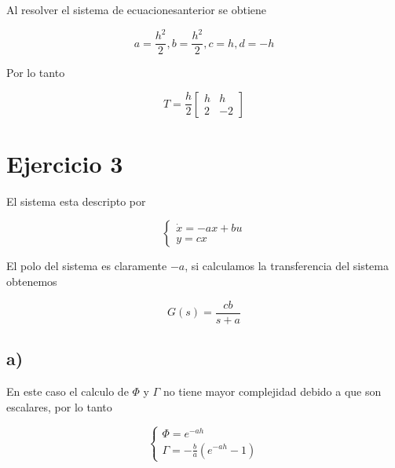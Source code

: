 \documentclass{article}
\begin{document}
        Al resolver el sistema de ecuacionesanterior se obtiene 

        \begin{equation}
            a = \frac{h^2}{2}, b = \frac{h^2}{2}, c=h, d=-h
        \end{equation}

        Por lo tanto 

        \begin{equation}
            T = \frac{h}{2}
                \begin{bmatrix}
                    h & h \\
                    2 & -2 
                \end{bmatrix}
        \end{equation}

    \section{Ejercicio 3}

    El sistema esta descripto por 

    \begin{equation}
        \left\{
            \begin{array}{c}
                \dot{x} = -ax + bu \\
                y = cx
            \end{array}    
        \right.
    \end{equation}

    El polo del sistema es claramente $-a$, si calculamos la transferencia del sistema obtenemos 

    \begin{equation}
        G(s) = \frac{cb}{s + a}
    \end{equation}

    \subsection{a)}

    En este caso el calculo de $\Phi$ y $\Gamma$ no tiene mayor complejidad debido a que son escalares, por lo tanto 

    \begin{equation}
        \left\{
            \begin{array}{c}
                \Phi = e^{-ah} \\ 
                \Gamma = -\frac{b}{a} ( e^{-ah} - 1 )
            \end{array}
        \right.
    \end{equation}
\end{document}
